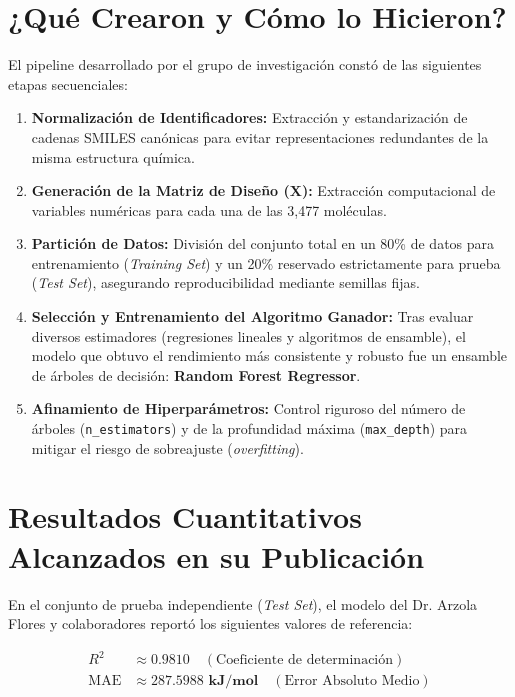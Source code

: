\documentclass[11pt,letterpaper]{report}
\begin{document}
\section{¿Qué Crearon y Cómo lo Hicieron?}
El pipeline desarrollado por el grupo de investigación constó de las siguientes etapas secuenciales:

\begin{enumerate}[leftmargin=*]
    \item \textbf{Normalización de Identificadores:} Extracción y estandarización de cadenas SMILES canónicas para evitar representaciones redundantes de la misma estructura química.
    \item \textbf{Generación de la Matriz de Diseño ($\mathbf{X}$):} Extracción computacional de variables numéricas para cada una de las 3,477 moléculas.
    \item \textbf{Partición de Datos:} División del conjunto total en un 80\% de datos para entrenamiento (\textit{Training Set}) y un 20\% reservado estrictamente para prueba (\textit{Test Set}), asegurando reproducibilidad mediante semillas fijas.
    \item \textbf{Selección y Entrenamiento del Algoritmo Ganador:} Tras evaluar diversos estimadores (regresiones lineales y algoritmos de ensamble), el modelo que obtuvo el rendimiento más consistente y robusto fue un ensamble de árboles de decisión: \textbf{Random Forest Regressor}.
    \item \textbf{Afinamiento de Hiperparámetros:} Control riguroso del número de árboles (\texttt{n\_estimators}) y de la profundidad máxima (\texttt{max\_depth}) para mitigar el riesgo de sobreajuste (\textit{overfitting}).
\end{enumerate}

\section{Resultados Cuantitativos Alcanzados en su Publicación}
En el conjunto de prueba independiente (\textit{Test Set}), el modelo del Dr. Arzola Flores y colaboradores reportó los siguientes valores de referencia:
\begin{tcolorbox}[colback=boxbg,colframe=buapblue,title=Métricas Oficiales Reportadas en ACS Omega 2025]
\begin{align*}
    R^2 &\approx \mathbf{0.9810} \quad (\text{Coeficiente de determinación}) \\
    \text{MAE} &\approx \mathbf{287.5988\text{ kJ/mol}} \quad (\text{Error Absoluto Medio})
\end{align*}
\end{tcolorbox}
\end{document}

